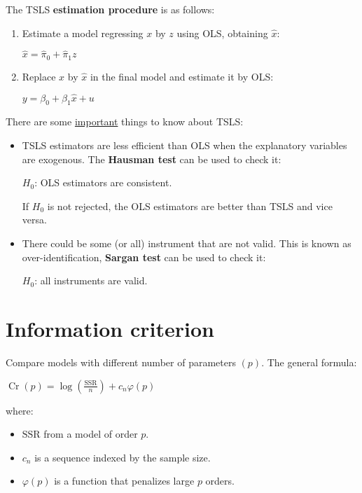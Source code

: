 \documentclass[10pt, a4paper, landscape]{article}
\DeclareMathOperator{\Cr}{Cr}
\newcommand{\SSR}{\text{SSR}}
\begin{document}
\begin{multicols}{3}
\begin{itemize}[leftmargin=*]
	The TSLS \textbf{estimation procedure} is as follows:
	\begin{enumerate}[leftmargin=*]
		\item Estimate a model regressing \( x \) by \( z \) using OLS, obtaining \( \hat{x} \):
		\begin{center}
			\( \hat{x} = \hat{\pi}_{0} + \hat{\pi}_{1} z \)
		\end{center}
		\item Replace \( x \) by \( \hat{x} \) in the final model and estimate it by OLS:
		\begin{center}
			\( y = \beta_{0} + \beta_{1} \hat{x}+ u \)
		\end{center}
	\end{enumerate}
	There are some \underline{important} things to know about TSLS:
	\begin{itemize}[leftmargin=*]
		\item TSLS estimators are less efficient than OLS when the explanatory variables are exogenous. The \textbf{Hausman test} can be used to check it:
		\begin{center}
			\( H_{0} \): OLS estimators are consistent.
		\end{center}
		If \( H_{0} \) is not rejected, the OLS estimators are better than TSLS and vice versa.
		\item There could be some (or all) instrument that are not valid. This is known as over-identification, \textbf{Sargan test} can be used to check it:
		\begin{center}
			\( H_{0} \): all instruments are valid.
		\end{center}
	\end{itemize}
\end{itemize}

\columnbreak

\section*{Information criterion}

Compare models with different number of parameters \( (p) \). The general formula:

\begin{center}
	\( \Cr(p) = \log(\frac{\SSR}{n}) + c_{n} \varphi(p) \)
\end{center}

where:

\begin{itemize}[leftmargin=*]
	\item \( \SSR \) from a model of order \( p \).
	\item \( c_{n} \) is a sequence indexed by the sample size.
	\item \( \varphi(p) \) is a function that penalizes large \( p \) orders.
\end{itemize}


\end{multicols}
\end{document}
